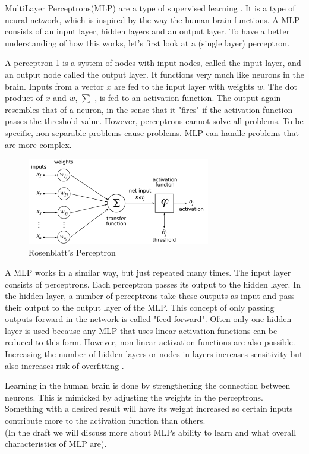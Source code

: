 MultiLayer Perceptrons(MLP) are a type of supervised learning \cite{michie1994machine}. It is a type of neural network, which is inspired by the way the human brain functions. A MLP consists of an input layer, hidden layers and an output layer. To have a better understanding of how this works, let's first look at a (single layer) perceptron\cite{rosenblatt1958perceptron}. 

A perceptron \ref{fig:perceptron} is a system of nodes with input nodes, called the input layer, and an output node called the output layer. It functions very much like neurons in the brain. Inputs from a vector $x$ are fed to the input layer with weights $w$. The dot product of $x$ and $w$, $\sum$ ,  is fed to an activation function. The output again resembles that of a neuron, in the sense that it "fires" if the activation function passes the threshold value. However, perceptrons cannot solve all problems. To be specific, non separable problems cause problems. MLP can handle problems that are more complex. \\
\begin{figure}[H]
    \includegraphics[width=80mm]{./img/perceptron.png}
    \caption{Rosenblatt's Perceptron \cite{wikiPerceptronPNG}}
    \label{fig:perceptron}
\end{figure}

A MLP works in a similar way, but just repeated many times. The input layer consists of perceptrons. Each perceptron passes its output to the hidden layer. In the hidden layer, a number of perceptrons take these outputs as input and pass their output to the output layer of the MLP. This concept of only passing outputs forward in the network is called "feed forward". Often only one hidden layer is used because any MLP that uses linear activation functions can be reduced to this form. However, non-linear activation functions are also possible. Increasing the number of hidden layers or nodes in layers increases sensitivity but also increases risk of overfitting \cite{Murtagh1991183}.

Learning in the human brain is done by strengthening the connection between neurons. This is mimicked by adjusting the weights in the perceptrons. Something with a desired result will have its weight increased so certain inputs contribute more to the activation function than others. \\
(In the draft we will discuss more about MLPs ability to learn and what overall characteristics of MLP are).